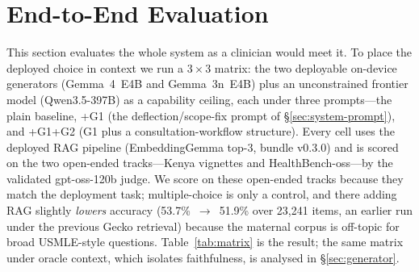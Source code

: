 \section{End-to-End Evaluation}
\label{sec:endtoend}

This section evaluates the whole system as a clinician would meet it. To
place the deployed choice in context we run a $3\times3$ matrix: the two
deployable on-device generators (Gemma~4~E4B and Gemma~3n~E4B) plus an
unconstrained frontier model (Qwen3.5-397B) as a capability ceiling, each
under three prompts---the plain baseline, \mbox{+G1} (the
deflection/scope-fix prompt of \S\ref{sec:system-prompt}), and \mbox{+G1+G2}
(G1 plus a consultation-workflow structure). Every cell uses the deployed
RAG pipeline (EmbeddingGemma top-3, bundle v0.3.0) and is scored on the two
open-ended tracks---Kenya vignettes and HealthBench-oss---by the validated
gpt-oss-120b judge. We score on these open-ended tracks because they match
the deployment task; multiple-choice is only a control, and there adding RAG
slightly \emph{lowers} accuracy (53.7\%~$\to$~51.9\% over 23{,}241 items, an
earlier run under the previous Gecko retrieval)
because the maternal corpus is off-topic for broad USMLE-style questions.
Table~\ref{tab:matrix} is the result; the same matrix under oracle context,
which isolates faithfulness, is analysed in \S\ref{sec:generator}.

